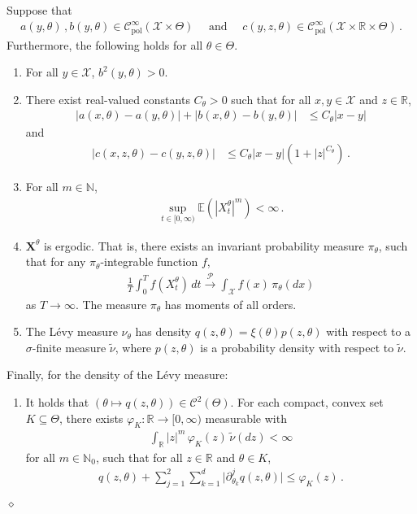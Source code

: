 \documentclass[11pt,a4paper]{article}
\newcommand{\thetak}{{\theta_k}}
\newcommand{\EE}{{\mathbb E}}
\newcommand{\RR}{{\mathbb R}}
\newcommand{\NN}{{\mathbb N}}
\newcommand{\X}{{\mathbf X}}
\newcommand{\cc}{{\mathcal{C}}}
\newcommand{\pp}{{\mathcal{P}}}
\newcommand{\xx}{{\mathcal{X}}}
\newcommand{\dqed}{{\leavevmode \unskip \penalty9999 \hbox{} \nobreak \hfill \quad \hbox{$\diamond$}}}
\numberwithin{equation}{section}
\numberwithin{theorem}{section}
\begin{document}
\begin{assumption}
Suppose that
\begin{align*}
  a(y, \theta)\,, b(y,\theta)\in \cc^\infty_{\text{pol}}( \xx\times \Theta)\quad
  \text{ and }\quad
  c(y, z, \theta) \in \cc^\infty_\text{pol}( \xx\times \RR \times \Theta)\,.
\end{align*}
Furthermore, the following holds for all $\theta \in \Theta$.
\begin{enumerate}[label=(\roman{*}), ref=(\roman{*})]
\item For all $y\in \xx$, $b^2(y, \theta) > 0$.
\item There exist real-valued constants $C_\theta>0$ such that  for all $x,y \in \xx$ and $z\in \RR$,
\begin{align*}
  |a(x, \theta) - a(y, \theta)| + |b(x, \theta) - b(y, \theta)|
  &\leq C_\theta |x-y|
\end{align*}
and
\begin{align*}
  |c(x,z, \theta) - c(y,z, \theta)|
  &\leq C_\theta |x-y|(1+|z|^{C_\theta})\,.
\end{align*}
\item \label{boundedmoments_jump} For all $m\in \NN$,
\begin{align*}
\sup_{t\in [0,\infty)} \EE ( |X^\theta_t|^m) < \infty\,.
\end{align*}
\item \label{x6} $\X^\theta$ is ergodic. That is, there exists an invariant probability measure $\pi_\theta$, such that for any $\pi_\theta$-integrable function $f$,
\begin{align}
  \frac{1}{T} \int_0^T f(X^\theta_t)\, dt
  \overset{\pp}{\longrightarrow}
  \int_\xx f(x) \,\pi_\theta(dx)
\label{ergodictheorem}
\end{align}
 as $T\to \infty$. The measure $\pi_\theta$ has moments of all orders. \item The L\'evy measure $\nu_\theta$ has density $q(z,\theta) = \xi(\theta)p(z,\theta)$ with respect to a $\sigma$-finite measure $\tilde{\nu}$, where $p(z,\theta)$ is a probability density with
respect to $\tilde{\nu}$.
\end{enumerate}
%
Finally, for the density of the L\'evy measure:
%
\begin{enumerate}[label=(\roman{*}), ref=(\roman{*}), resume]
\item\label{x3}  It holds that $(\theta \mapsto q(z, \theta)) \in \cc^2(\Theta)$. For each compact, convex set $K\subseteq \Theta$, there exists $\varphi_K: \RR \to [0,\infty)$ measurable with
\begin{align*}
\int_\RR |z|^m \,\varphi_K(z)\, \tilde{\nu}(dz) < \infty
\end{align*}
for all $m\in \NN_0$, such that for all $z \in \RR$ and $\theta \in K$, 
\begin{align*}
  q(z,\theta) + \sum_{j=1}^2 \sum_{k=1}^d \vert \partial^j_\thetak q(z, \theta)\vert
  \leq \varphi_K(z)\,.
\end{align*}
\end{enumerate}\dqed
\label{assumptions_on_X_jump}
\end{assumption}
\end{document}

